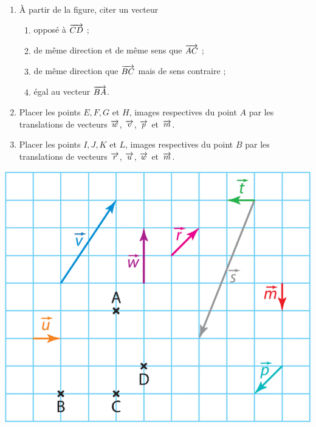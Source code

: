 \documentclass[11pt]{article}
\begin{document}
\begin{exo}~\\
  \begin{minipage}[]{.6\textwidth}
    \begin{enumerate}
      \item À partir de la figure, citer un vecteur
      \begin{enumerate}
        \item opposé à $\overrightarrow{CD}$ ;
        \item de même direction et de même sens que $\overrightarrow{AC}$ ;
        \item de même direction que $\overrightarrow{BC}$ mais de sens contraire ;
        \item égal au vecteur $\overrightarrow{BA}$.
    \end{enumerate}
      \item Placer les points $E, F, G$ et $H$, images respectives du point $A$
        par les translations de vecteurs $\overrightarrow{w}$, $\overrightarrow{v}$, $\overrightarrow{p}$ et~$\overrightarrow{m}$.
      \item Placer les points $I, J, K$ et $L$, images respectives du point $B$
        par les translations de vecteurs $\overrightarrow{r}$, $\overrightarrow{u}$, $\overrightarrow{w}$ et~$\overrightarrow{m}$.
    \end{enumerate}
  \end{minipage}
  \begin{minipage}[]{.4\textwidth}
    \begin{center}
      \includegraphics[scale=.2]{mucho-vectors.png}
    \end{center}
  \end{minipage}
\end{exo}
\end{document}
